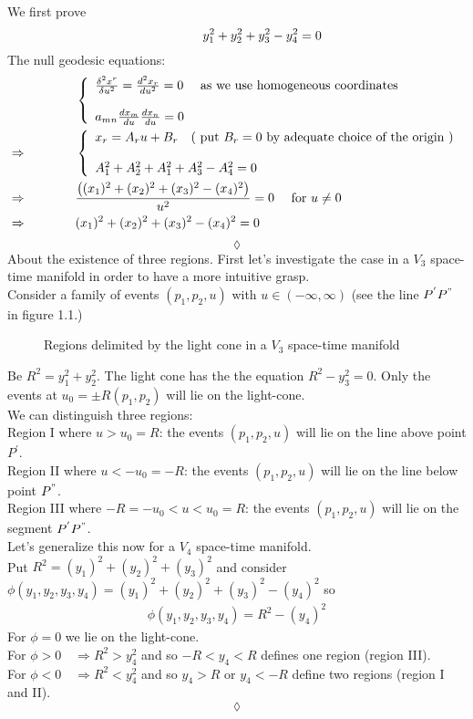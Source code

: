 We first prove 
$$\mathbf{\quad\quad\quad\quad} y^2_1+y^2_2+y^2_3-y^2_4=0$$
The null geodesic equations:
\begin{align*}
& \left\{ \begin{array}{l}
\frac{\delta^2 x^r}{\delta u^2} = \dv[2]{x_r}{u} =0 \quad \text{ as we use homogeneous coordinates}\\\\
a_{mn} \dv{x_m}{u}\dv{x_n}{u}=0\\
\end{array} \right.\\
\Rightarrow \quad\quad\quad\quad & \left\{ \begin{array}{l}
x_r = A_ru+B_r\quad \text{( put } B_r=0 \text{ by adequate choice of the origin )} \\\\
A_1^2+A_2^2+A_1^2+A_3^2-A_4^2=0\\
\end{array} \right.\\
\Rightarrow \quad\quad\quad\quad &\frac{\left((x_1)^2+(x_2)^2+(x_3)^2-(x_4)^2\right)}{u^2} = 0\quad \text{ for } u\neq 0\\
\Rightarrow \quad\quad\quad\quad &(x_1)^2+(x_2)^2+(x_3)^2-(x_4)^2 = 0
\end{align*}
$$\lozenge$$
About the existence of three regions. First let's investigate the case in a $V_3$ space-time manifold in order to have a more intuitive grasp.\\
Consider a family of events $(p_1,p_2,u)$ with $u\in\left(-\infty,\infty\right)$ (see the line $P^{'}P^{"}$ in figure 1.1.)
\begin{figure}[H]

\caption{Regions delimited by the light cone in a $V_3$ space-time manifold}
\label{fig:fig_p96_3415_a}
\end{figure}
Be $R^2 = y_1^2 +y_2^2$. The light cone has the the equation $R^2- y_3^2=0$. Only the events at $ u_0 = \pm R(p_1,p_2)$ will lie on the light-cone.\\
We can distinguish three regions:\\
Region I where $u > u_0 = R$: the events $(p_1,p_2,u)$ will lie on the line above point $P^{'}$.\\
Region II where $ u < -u_0 = -R$: the events $(p_1,p_2,u)$ will lie on the line below point $P^{"}$.\\
Region III where $ -R= -u_0 < u < u_0 = R$: the events $(p_1,p_2,u)$ will lie on the segment $P^{'}P^{"}$.\\
Let's generalize this now for a $V_4$ space-time manifold.\\
Put $R^2 = (y_1)^2+(y_2)^2+(y_3)^2$ and consider $\phi(y_1,y_2,y_3,y_4)= (y_1)^2+(y_2)^2+(y_3)^2-(y_4)^2$ so \begin{align}\phi(y_1,y_2,y_3,y_4)= R^2-(y_4)^2\end{align}
For $\phi=0$ we lie on the light-cone.\\
For $\phi>0 \quad\Rightarrow R^2 > y_4^2$ and so $-R<y_4<R$ defines one region (region III).\\
For $\phi<0 \quad\Rightarrow R^2 < y_4^2$ and so   $y_4>R$ or $y_4<-R$ define two  regions (region I and II).
$$\lozenge$$

